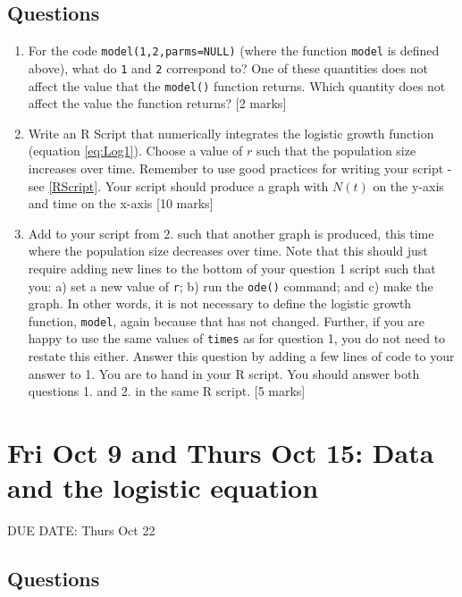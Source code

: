 \documentclass[]{book}
\begin{document}
\section{Questions}\label{questions}

\begin{enumerate}
\def\labelenumi{\arabic{enumi}.}
\item
  For the code \texttt{model(1,2,parms=NULL)} (where the function
  \texttt{model} is defined above), what do \texttt{1} and \texttt{2}
  correspond to? One of these quantities does not affect the value that
  the \texttt{model()} function returns. Which quantity does not affect
  the value the function returns? {[}2 marks{]}
\item
  Write an R Script that numerically integrates the logistic growth
  function (equation \eqref{eq:Log1}). Choose a value of \(r\) such that
  the population size increases over time. Remember to use good
  practices for writing your script - see \ref{RScript}. Your script
  should produce a graph with \(N(t)\) on the y-axis and time on the
  x-axis {[}10 marks{]}
\item
  Add to your script from 2. such that another graph is produced, this
  time where the population size decreases over time. Note that this
  should just require adding new lines to the bottom of your question 1
  script such that you: a) set a new value of \texttt{r}; b) run the
  \texttt{ode()} command; and c) make the graph. In other words, it is
  not necessary to define the logistic growth function, \texttt{model},
  again because that has not changed. Further, if you are happy to use
  the same values of \texttt{times} as for question 1, you do not need
  to restate this either. Answer this question by adding a few lines of
  code to your answer to 1. You are to hand in your R script. You should
  answer both questions 1. and 2. in the same R script. {[}5 marks{]}
\end{enumerate}

\chapter{Fri Oct 9 and Thurs Oct 15: Data and the logistic
equation}\label{fri-oct-9-and-thurs-oct-15-data-and-the-logistic-equation}

DUE DATE: Thurs Oct 22

\section{Questions}\label{questions}
\end{document}
